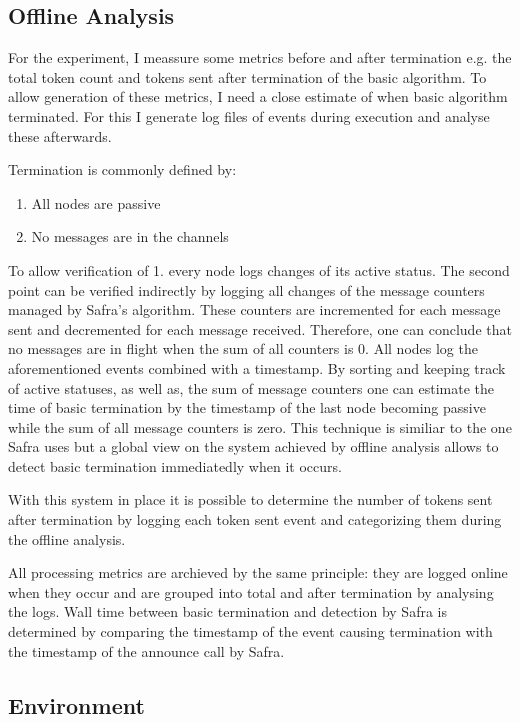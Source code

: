   

\subsection{Offline Analysis}
For the experiment, I meassure some metrics before and after termination e.g. the total token count and tokens sent after termination of the basic algorithm.
To allow generation of these metrics, I need a close estimate of when basic algorithm terminated.
For this I generate log files of events during execution and analyse these afterwards.

Termination is commonly defined by:
\begin{enumerate}
	\item All nodes are passive
	\item No messages are in the channels
\end{enumerate}
To allow verification of 1. every node logs changes of its active status.
The second point can be verified indirectly by logging all changes of the message counters managed by Safra's algorithm.
These counters are incremented for each message sent and decremented for each message received.
Therefore, one can conclude that no messages are in flight when the sum of all counters is 0.
All nodes log the aforementioned events combined with a timestamp.
By sorting and keeping track of active statuses, as well as, the sum of message counters one can estimate the time of basic termination by the timestamp of the last node becoming passive while the sum of all message counters is zero.
This technique is similiar to the one Safra uses but a global view on the system achieved by offline analysis allows to detect basic termination immediatedly when it occurs.

With this system in place it is possible to determine the number of tokens sent after termination by logging each token sent event and categorizing them during the offline analysis.

All processing metrics are archieved by the same principle: they are logged online when they occur and are grouped into total and after termination by analysing the logs.
Wall time between basic termination and detection by Safra is determined by comparing the timestamp of the event causing termination with the timestamp of the announce call by Safra.

\subsection{Environment}
